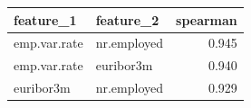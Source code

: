 \begin{tabular}{llr}
\toprule
feature\_1 & feature\_2 & spearman \\
\midrule
emp.var.rate & nr.employed & 0.945 \\
emp.var.rate & euribor3m & 0.940 \\
euribor3m & nr.employed & 0.929 \\
\bottomrule
\end{tabular}
